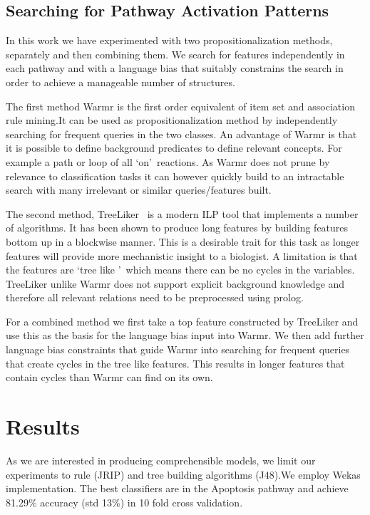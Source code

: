 \documentclass[runningheads,a4paper]{llncs}
\begin{document}
\subsection{Searching for Pathway Activation Patterns}
In this work we have experimented with two propositionalization methods, separately and then combining them. We search for features independently in each pathway and with a language bias that suitably constrains the search in order to achieve a manageable number of structures. 

The first method Warmr \citep{dehaspe_mining_1997} is the first order equivalent of item set and association rule mining.It can be used as propositionalization method by independently searching for frequent queries in the two classes. An advantage of Warmr is that it is possible to define background predicates to define relevant concepts. For example a path or loop of all \lq on\rq\ reactions. As Warmr does not prune by relevance to classification tasks it can however quickly build to an intractable search with many irrelevant or similar queries/features built. 
	     

The second method, TreeLiker~\citep{vzelezny2013fast} is a modern ILP tool that implements a number of algorithms. It has been shown to produce long features by building features bottom up in a blockwise manner. This is a desirable trait for  this task as longer features will provide more mechanistic insight to a biologist. A limitation is that the features are \lq tree like \rq\ which means there can be no cycles in the variables. TreeLiker unlike Warmr does not support explicit background knowledge and therefore all relevant relations need to be preprocessed using prolog.

For a combined method we first take a top feature constructed by TreeLiker and use this as the basis for the language bias input into Warmr. We then add further language bias constraints that guide Warmr into searching for frequent queries that create cycles in the tree like features. This results in longer features that contain cycles than Warmr can find on its own. 
	     
	     
\section{Results}
As we are interested in producing comprehensible models, we limit our experiments to rule (JRIP) and tree building algorithms (J48).We employ Wekas implementation. The best classifiers are in the Apoptosis pathway and achieve 81.29\% accuracy (std 13\%) in 10 fold cross validation.
\newpage
\end{document}
